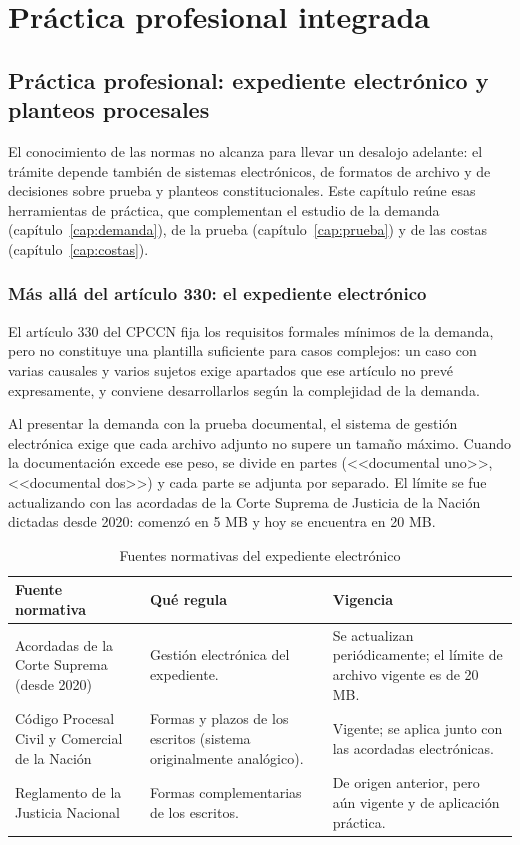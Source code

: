 \documentclass[12pt,oneside]{book}
\begin{document}
\part{Práctica profesional integrada}

\chapter{Práctica profesional: expediente electrónico y planteos procesales}\label{cap:practica}

El conocimiento de las normas no alcanza para llevar un desalojo adelante: el trámite depende también de sistemas electrónicos, de formatos de archivo y de decisiones sobre prueba y planteos constitucionales. Este capítulo reúne esas herramientas de práctica, que complementan el estudio de la demanda (capítulo~\ref{cap:demanda}), de la prueba (capítulo~\ref{cap:prueba}) y de las costas (capítulo~\ref{cap:costas}).

\section{Más allá del artículo 330: el expediente electrónico}

El artículo 330 del CPCCN fija los requisitos formales mínimos de la demanda, pero no constituye una plantilla suficiente para casos complejos: un caso con varias causales y varios sujetos exige apartados que ese artículo no prevé expresamente, y conviene desarrollarlos según la complejidad de la demanda.

Al presentar la demanda con la prueba documental, el sistema de gestión electrónica exige que cada archivo adjunto no supere un tamaño máximo. Cuando la documentación excede ese peso, se divide en partes (<<documental uno>>, <<documental dos>>) y cada parte se adjunta por separado. El límite se fue actualizando con las acordadas de la Corte Suprema de Justicia de la Nación dictadas desde 2020: comenzó en 5 MB y hoy se encuentra en 20 MB.

\begin{table}[H]
\centering
\caption{Fuentes normativas del expediente electrónico}
\begin{tabularx}{\textwidth}{>{\raggedright\arraybackslash}p{} >{\raggedright\arraybackslash}p{} X}
\toprule
\textbf{Fuente normativa} & \textbf{Qué regula} & \textbf{Vigencia} \\
\midrule
Acordadas de la Corte Suprema (desde 2020) & Gestión electrónica del expediente. & Se actualizan periódicamente; el límite de archivo vigente es de 20 MB. \\
Código Procesal Civil y Comercial de la Nación & Formas y plazos de los escritos (sistema originalmente analógico). & Vigente; se aplica junto con las acordadas electrónicas. \\
Reglamento de la Justicia Nacional & Formas complementarias de los escritos. & De origen anterior, pero aún vigente y de aplicación práctica. \\
\bottomrule
\end{tabularx}
\end{table}
\end{document}
